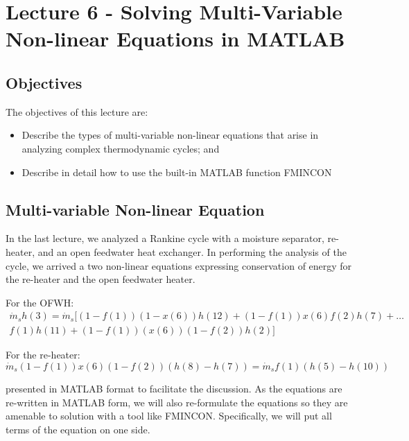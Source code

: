 \chapter{Lecture 6 - Solving Multi-Variable Non-linear Equations in MATLAB}
\label{ch:ch6}
\section{Objectives}
The objectives of this lecture are:
\begin{itemize}
\item Describe the types of multi-variable non-linear equations that arise in analyzing complex thermodynamic cycles; and
\item Describe in detail how to use the built-in MATLAB function FMINCON
\end{itemize}

\section{Multi-variable Non-linear Equation}
In the last lecture, we analyzed a Rankine cycle with a moisture separator, re-heater, and an open feedwater heat exchanger.  In performing the analysis of the cycle, we arrived a two non-linear equations expressing conservation of energy for the re-heater and the open feedwater heater.  

For the OFWH:
\begin{multline}
\dot{m}_s h(3) = \dot{m}_s [(1-f(1))(1-x(6))h(12) + (1-f(1))x(6)f(2)h(7) + \dots \\
 f(1)h(11) + (1-f(1))(x(6))(1-f(2))h(2) ] 
\label{eq:Ebal_OFWH1}
\end{multline}

For the re-heater:
\begin{equation}
\dot{m}_s(1-f(1))x(6)(1-f(2))(h(8)-h(7)) = \dot{m}_s f(1)(h(5)-h(10))
\label{eq:Ebal_RH1}
\end{equation}

 presented in MATLAB format to facilitate the discussion.  As the equations are re-written in MATLAB form, we will also re-formulate the equations so they are amenable to solution with a tool like FMINCON.  Specifically, we will put all terms of the equation on one side.


